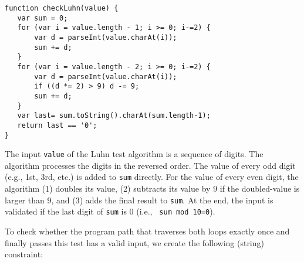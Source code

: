 \documentclass[sigplan,review,anonymous]{acmart}\settopmatter{printfolios=true,printccs=false,printacmref=false}
\begin{document}


%

\begin{Verbatim}[fontsize=\small]
function checkLuhn(value) {
   var sum = 0;
   for (var i = value.length - 1; i >= 0; i-=2) {
       var d = parseInt(value.charAt(i));
       sum += d;
   }	
   for (var i = value.length - 2; i >= 0; i-=2) {
       var d = parseInt(value.charAt(i));
       if ((d *= 2) > 9) d -= 9;
       sum += d;
   }
   var last= sum.toString().charAt(sum.length-1);
   return last == '0';
}
\end{Verbatim}


The input \verb|value| of the Luhn test algorithm is a sequence of digits. The algorithm processes the digits in the reversed order. The value of every odd digit (e.g., 1st, 3rd, etc.) is added to \verb|sum| directly. For the value of every even digit, the algorithm (1) doubles its value, (2) subtracts its value by $9$ if the doubled-value is larger than $9$, and (3) adds the final result to \verb|sum|. At the end, the input is validated if the last digit of \verb|sum| is $0$ (i.e., \verb| sum mod 10=0|).

To check whether the program path that traverses both loops exactly once and finally passes this test has a valid input, we create the following (string) constraint:
\end{document}
